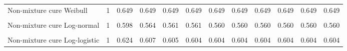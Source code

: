 \documentclass[
]{article}
\begin{document}
\begin{table}[H]
{\begin{tabular}[t]{lrrrrrrrrrrr}
Non-mixture cure Weibull & 1 & 0.649 & 0.649 & 0.649 & 0.649 & 0.649 & 0.649 & 0.649 & 0.649 & 0.649 & 0.649\\
\cellcolor{gray!10}{Mixture cure Log-normal} & \cellcolor{gray!10}{1} & \cellcolor{gray!10}{0.600} & \cellcolor{gray!10}{0.573} & \cellcolor{gray!10}{0.571} & \cellcolor{gray!10}{0.571} & \cellcolor{gray!10}{0.571} & \cellcolor{gray!10}{0.571} & \cellcolor{gray!10}{0.571} & \cellcolor{gray!10}{0.571} & \cellcolor{gray!10}{0.571} & \cellcolor{gray!10}{0.571}\\
Non-mixture cure Log-normal & 1 & 0.598 & 0.564 & 0.561 & 0.561 & 0.560 & 0.560 & 0.560 & 0.560 & 0.560 & 0.560\\
\cellcolor{gray!10}{Mixture cure Log-logistic} & \cellcolor{gray!10}{1} & \cellcolor{gray!10}{0.624} & \cellcolor{gray!10}{0.606} & \cellcolor{gray!10}{0.604} & \cellcolor{gray!10}{0.604} & \cellcolor{gray!10}{0.604} & \cellcolor{gray!10}{0.604} & \cellcolor{gray!10}{0.604} & \cellcolor{gray!10}{0.603} & \cellcolor{gray!10}{0.603} & \cellcolor{gray!10}{0.603}\\
Non-mixture cure Log-logistic & 1 & 0.624 & 0.607 & 0.605 & 0.604 & 0.604 & 0.604 & 0.604 & 0.604 & 0.604 & 0.604\\
\bottomrule
\end{tabular}}
\end{table}
\end{document}
